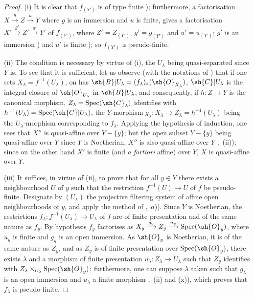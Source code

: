 \begin{proof}
(i) It is clear that $f_{(Y')}$ is of type finite ); furthermore, a factorisation $X\xrightarrow{g}Z\xrightarrow{u}Y$ where $g$ is an immersion and $u$ is finite, gives a factorisation $X'\xrightarrow{g'}Z'\xrightarrow{u'}Y'$ of $f_{(Y')}$, where $Z'=Z_{(Y')}$, $g'=g_{(Y')}$ and $u'=u_{(Y')}$; $g'$ is an immersion ) and $u'$ is finite ); so $f_{(Y')}$ is pseudo-finite.

(ii) The condition is necessary by virtue of (i), the $U_\lambda$ being quasi-separated since $Y$ is.
To see that it is sufficient, let us observe (with the notations of ) that if one sets $X_\lambda=f^{-1}(U_\lambda)$, on has $\sh{B}|U_\lambda=(f_\lambda)_*(\sh{O}_{X_\lambda})$, $\sh{C}|U_\lambda$ is the integral closure of $\sh{O}_{U_\lambda}$ in $\sh{B}|U_\lambda$, and consequently, if $h:Z\to Y$ is the canonical morphism, $Z_\lambda=\operatorname{Spec}(\sh{C}_\lambda)$ identifies with $h^{-1}(U_\lambda)=\operatorname{Spec}(\sh{C}|U_\lambda)$, the $Y$-morphism $g_\lambda:X_\lambda\to Z_\lambda=h^{-1}(U_\lambda)$ being the $U_\lambda$-morphism corresponding to $f_\lambda$.
Applying the hypothesis of induction, one sees that $X''$ is quasi-affine over $Y-\{y\}$; but the open subset $Y-\{y\}$ being quasi-affine over $Y$ since $Y$ is Noetherian, $X''$ is also quasi-affine over $Y$ ,~(ii)); since on the other hand $X'$ is finite (and \emph{a fortiori} affine) over $Y$, $X$ is quasi-affine over $Y$.

(iii) It suffices, in virtue of (ii), to prove that for all $y\in Y$ there exists a neighbourhood $U$ of $y$ such that the restriction $f^{-1}(U)\to U$ of $f$ be pseudo-finite.
Designate by $(U_\lambda)$ the projective filtering system of affine open neighbourhoods of $y$, and apply the method of ,~$a$)).
Since $Y$ is Noetherian, the restrictions $f_\lambda:f^{-1}(U_\lambda)\to U_\lambda$ of $f$ are of finite presentation and of the same nature as $f_y$.
By hypothesis $f_y$ factorises as $X_y\xrightarrow{g_y}Z_y\xrightarrow{u_y}\operatorname{Spec}(\sh{O}_y)$, where $u_y$ is finite and $g_y$ is an open immersion.
As $\sh{O}_y$ is Noetherian, it is of the same nature as $Z_y$, and as $Z_y$ is of finite presentation over $\operatorname{Spec}(\sh{O}_y)$, there exists $\lambda$ and a morphism of finite presentation $u_\lambda:Z_\lambda\to U_\lambda$ such that $Z_y$ identifies with $Z_\lambda\times_{U_\lambda}\operatorname{Spec}(\sh{O}_y)$; furthermore, one can suppose $\lambda$ taken such that $g_\lambda$ is an open immersion and $u_\lambda$ a finite morphism ,~(ii) and (x)), which proves that $f_\lambda$ is pseudo-finite.
\end{proof}

